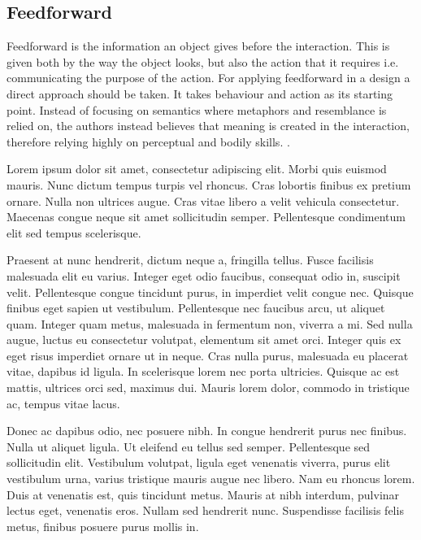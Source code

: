 \subsection{Feedforward}
Feedforward is the information an object gives before the interaction. This is given both by the way the object looks, but also the action that it requires i.e. communicating the purpose of the action. For applying feedforward in a design a direct approach should be taken. It takes behaviour and action as its starting point. Instead of focusing on semantics where metaphors and resemblance is relied on, the authors instead believes that meaning is created in the interaction, therefore relying highly on perceptual and bodily skills. \cite{howdonald}.



\newpage



Lorem ipsum dolor sit amet, consectetur adipiscing elit. Morbi quis euismod mauris. Nunc dictum tempus turpis vel rhoncus. Cras lobortis finibus ex pretium ornare. Nulla non ultrices augue. Cras vitae libero a velit vehicula consectetur. Maecenas congue neque sit amet sollicitudin semper. Pellentesque condimentum elit sed tempus scelerisque.

Praesent at nunc hendrerit, dictum neque a, fringilla tellus. Fusce facilisis malesuada elit eu varius. Integer eget odio faucibus, consequat odio in, suscipit velit. Pellentesque congue tincidunt purus, in imperdiet velit congue nec. Quisque finibus eget sapien ut vestibulum. Pellentesque nec faucibus arcu, ut aliquet quam. Integer quam metus, malesuada in fermentum non, viverra a mi. Sed nulla augue, luctus eu consectetur volutpat, elementum sit amet orci. Integer quis ex eget risus imperdiet ornare ut in neque. Cras nulla purus, malesuada eu placerat vitae, dapibus id ligula. In scelerisque lorem nec porta ultricies. Quisque ac est mattis, ultrices orci sed, maximus dui. Mauris lorem dolor, commodo in tristique ac, tempus vitae lacus.

Donec ac dapibus odio, nec posuere nibh. In congue hendrerit purus nec finibus. Nulla ut aliquet ligula. Ut eleifend eu tellus sed semper. Pellentesque sed sollicitudin elit. Vestibulum volutpat, ligula eget venenatis viverra, purus elit vestibulum urna, varius tristique mauris augue nec libero. Nam eu rhoncus lorem. Duis at venenatis est, quis tincidunt metus. Mauris at nibh interdum, pulvinar lectus eget, venenatis eros. Nullam sed hendrerit nunc. Suspendisse facilisis felis metus, finibus posuere purus mollis in.


